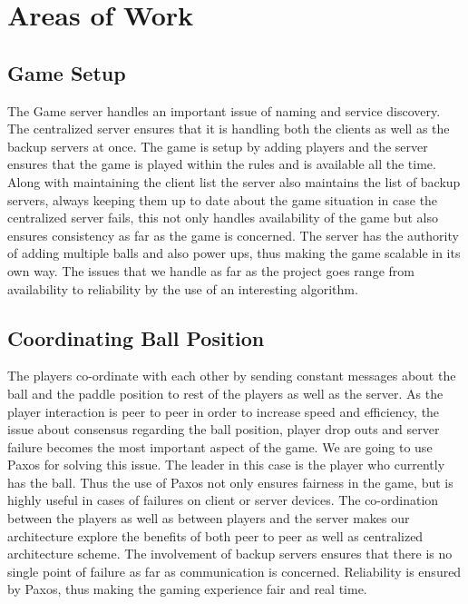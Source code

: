 \documentclass{sig-alternate}
\begin{document}
\section{Areas of Work}
\label{areas of work}


\subsection{Game Setup}

The Game server handles an important issue of naming and service discovery.
The centralized server ensures  that it is handling both the clients as
well as the backup servers at once. The game is setup by adding players and
the server ensures  that the game is played within the rules and is
available all the time. Along with maintaining the client list the server
also maintains the list of backup servers, always keeping them up to date
about the game situation in case the centralized server fails, this not
only handles availability of the game but also ensures consistency as far
as the game is concerned. The server has the authority of adding multiple
balls and also power ups, thus making the game scalable in its own way. The
issues that we handle as far as the project goes range from availability to
reliability by the use of an interesting algorithm.

\subsection{Coordinating Ball Position}

The players co-ordinate with each other by sending constant messages about
the ball and the paddle position to rest of the players as well as the
server. As the player interaction is peer to peer in order to increase
speed and efficiency, the issue about consensus regarding the ball
position, player drop outs and server failure becomes the most important
aspect of the game. We are going to use Paxos\cite{lamport:paxos} for
solving this issue. The leader in this case is the player who currently has
the ball. Thus the use of Paxos not only ensures fairness in the game, but
is highly useful in cases of failures on client or server devices. The
co-ordination between the players as well as between players and the server
makes our architecture explore the benefits of both peer to peer as well as
centralized architecture scheme. The involvement of backup servers ensures
that there is no single point of failure as far as communication is
concerned. Reliability is ensured by Paxos, thus making the gaming
experience fair and real time.
\end{document}
